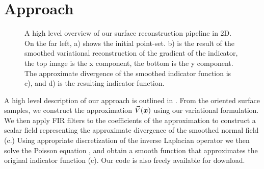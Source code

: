 \section{Approach}
\label{sec:pipeline}
\begin{figure*} 
	\centering
	
	\caption{A high level overview of our surface reconstruction pipeline in 2D. On the far left, a) shows the initial point-set. b) is the result of the smoothed variational reconstruction of the gradient of the indicator, the top image is the x component, the bottom is the y component. The approximate divergence of the smoothed indicator function is c), and d) is the resulting indicator function. }
	\label{fig:pipeline}
\end{figure*}

A high level description of our approach is outlined in . 
From the oriented surface samples, we construct the approximation $\vec{V}(\boldsymbol{x})$ using our variational formulation. 
We then apply FIR filters to the coefficients of the approximation to construct a scalar field representing the approximate divergence of the smoothed normal field (c.) 
Using appropriate discretization of the inverse Laplacian operator we then solve the Poisson equation , and obtain a smooth function that approximates the original indicator function (c). 
Our code is also freely available for download.


